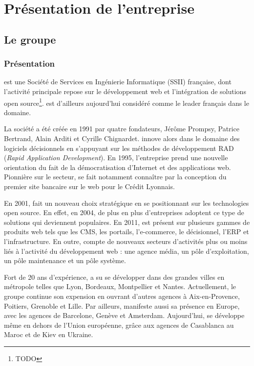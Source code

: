 \chapter{Présentation de l'entreprise}

\section{Le groupe \asmile}

\subsection{Présentation}

\asmile{} est une Société de Services en Ingénierie Informatique (SSII) française, dont l'activité principale repose sur le développement web et l'intégration de solutions open source\footnote{TODO}.
\asmile{} est d'ailleurs aujourd'hui considéré comme le leader français dans le domaine.

La société a été créée en 1991 par quatre fondateurs, Jérôme Prompsy, Patrice Bertrand, Alain Arditi et Cyrille Chignardet.
\asmile{} innove alors dans le domaine des logiciels décisionnels en s'appuyant sur les méthodes de développement RAD (\textit{Rapid Application Development}).
En 1995, l'entreprise prend une nouvelle orientation du fait de la démocratisation d'Internet et des applications web.
Pionnière sur le secteur, \asmile{} se fait notamment connaître par la conception du premier site bancaire sur le web pour le Crédit Lyonnais.

En 2001, \asmile{} fait un nouveau choix stratégique en se positionnant sur les technologies open source.
En effet, en 2004, de plus en plus d'entreprises adoptent ce type de solutions qui deviennent populaires.
En 2011, \asmile{} est présent sur plusieurs gammes de produits web tels que les CMS, les portails, l'e-commerce, le décisionnel, l'ERP et l'infrastructure.
En outre, \asmile{} compte de nouveaux secteurs d'activités plus ou moins liés à l'activité du développement web : une agence média, un pôle d'exploitation, un pôle maintenance et un pôle système.

Fort de 20 ans d'expérience, \asmile{} a su se développer dans des grandes villes en métropole telles que Lyon, Bordeaux, Montpellier et Nantes.
Actuellement, le groupe continue son expension en ouvrant d'autres agences à Aix-en-Provence, Poitiers, Grenoble et Lille.
Par ailleurs, \asmile{} manifeste aussi sa présence en Europe, avec les agences de Barcelone, Genève et Amsterdam.
Aujourd'hui, \asmile{} se développe même en dehors de l'Union européenne, grâce aux agences de Casablanca au Maroc et de Kiev en Ukraine.

